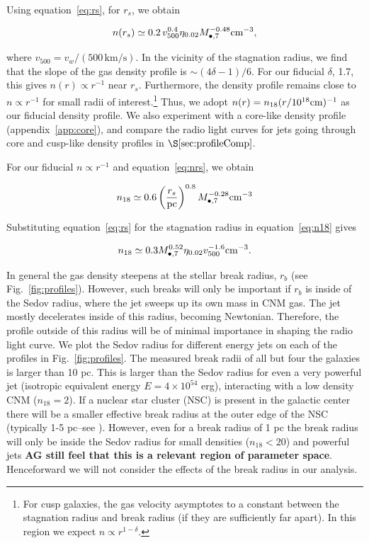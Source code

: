 \documentclass[usenatbib,fleqn]{mnras}
\newcommand{\Mbh}[1][]{M_{\bullet#1}}
\newcommand{\rs}{r_s}
\begin{document}
Using equation~\eqref{eq:rs}, for $r_s$, we obtain 

\begin{equation}
n(r_s) \simeq 0.2 \, v_{500}^{0.4} \eta_{0.02} \Mbh[,7]^{-0.48} {\rm cm}^{-3},
\label{eq:nrs2}
\end{equation}

where $v_{500}=v_w/\left(500 \,\mathrm{km/s}\right)$. In the vicinity of
the stagnation radius, we find that the slope of the gas density
profile is $\sim (4\delta-1)/6$. For our fiducial $\delta$, 1.7, this
gives $n(r)\propto r^{-1}$ near $\rs$. Furthermore, the density
profile remains close to $n\propto r^{-1}$ for small radii of
interest.\footnote{For cusp galaxies, the gas velocity asymptotes to a
  constant between the stagnation radius and break radius (if they are
  sufficiently far apart). In this region we expect $n\propto
  r^{1-\delta}$.}  Thus, we adopt $n(r)= n_{18} (r/10^{18} {\rm
  cm})^{-1}$ as our fiducial density profile.  We also experiment with
a core-like density profile (appendix~\ref{app:core}), and compare the
radio light curves for jets going through core and cusp-like density
profiles in $\S\ref{sec:profileComp}$.


For our fiducial $n\propto r^{-1}$ and equation~\eqref{eq:nrs}, we
obtain

\begin{equation}
  n_{18}\simeq 0.6 \left(\frac{r_s}{\rm pc}\right)^{0.8}
  \Mbh[,7]^{-0.28} {\rm cm^{-3}}
  \label{eq:n18}
\end{equation}

Substituting equation~\eqref{eq:rs} for the stagnation radius in
equation~\eqref{eq:n18} gives 

\begin{equation}
n_{18}\simeq 0.3 \Mbh[,7]^{0.52} \eta_{0.02} v_{500}^{-1.6} {\rm
  cm^{-3}}.
\label{eq:n182}
\end{equation} 


In general the gas density steepens at the stellar break radius, $r_b$
(see Fig.~\ref{fig:profiles}). However, such breaks will only be
important if $r_b$ is inside of the Sedov radius, where the jet
sweeps up its own mass in CNM gas.  The jet mostly decelerates inside
of this radius, becoming Newtonian. Therefore, the profile outside of
this radius will be of minimal importance in shaping the radio
light curve. We plot the Sedov radius for different energy jets on
each of the profiles in Fig.~\ref{fig:profiles}. The measured break
radii of all but four the \citet{Lauer+2007} galaxies is larger than
10 pc. This is larger than the Sedov radius for even a very powerful
jet (isotropic equivalent energy $E=4\times 10^{54}$ erg), interacting
with a low density CNM ($n_{18}=2$). If a nuclear star cluster (NSC)
is present in the galactic center there will be a smaller effective
break radius at the outer edge of the NSC (typically 1-5 pc--see
\citealt{Georgiev+2014}). However, even for a break radius of 1 pc the
break radius will only be inside the Sedov radius for small densities
($n_{18}<20$) and powerful jets {\bf AG still feel that this is a
  relevant region of parameter space}. Henceforward we will not
consider the effects of the break radius in our analysis.
\end{document}
